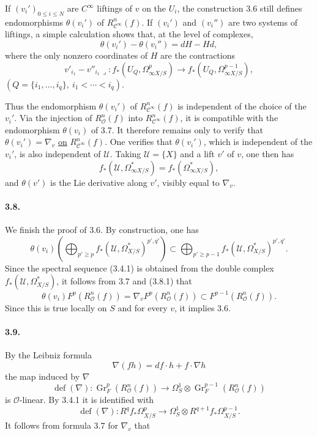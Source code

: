 \documentclass[10pt,leqno]{article}
\newcommand{\cO}{\mathcal O}
\newcommand{\cU}{\mathcal U}
\newcommand{\cC}{\mathcal C}
\newcommand{\Gr}{\operatorname{Gr}}
\theoremstyle{deligne}
\renewcommand{\underline}[1]{\uline{#1}}
\begin{document}
If $(v_i')_{0\le i\le N}$ are $C^\infty$ liftings of $v$ on the $U_i$, the construction 3.6 still defines endomorphisms $\theta(v_i')$ of $R_{\cC^\infty}^n(f)$. If $(v_i')$ and $(v_i'')$ are two systems of liftings, a simple calculation shows that, at the level of complexes,
\begin{equation}
\theta(v_i')-\theta(v_i'')=dH-Hd,
\tag{3.7.1}
\end{equation}
where the only nonzero coordinates of $H$ are the contractions
\[
v'_{i_1}-v''_{i_1}\lrcorner:
 f_*(U_Q,\Omega^p_{\infty X/S})\longrightarrow f_*(U_Q,\Omega^{p-1}_{\infty X/S}),
\]
$(Q=\{i_1,\ldots,i_q\},\ i_1<\cdots<i_q)$.

Thus the endomorphism $\theta(v_i')$ of $R_{\cC^\infty}^n(f)$ is independent of the choice of the $v_i'$. Via the injection of $R_\cO^n(f)$ into $R_{\cC^\infty}^n(f)$, it is compatible with the endomorphism $\theta(v_i)$ of 3.7. It therefore remains only to verify that $\theta(v_i')=\nabla_v$ \underline{on} $R_{\cC^\infty}^n(f)$. One verifies that $\theta(v_i')$, which is independent of the $v_i'$, is also independent of $\cU$. Taking $\cU=\{X\}$ and a lift $v'$ of $v$, one then has
\[
f_*(\cU,\Omega^*_{\infty X/S})=f_*(\Omega^*_{\infty X/S}),
\]
and $\theta(v')$ is the Lie derivative along $v'$, visibly equal to $\nabla_v$.

\paragraph{3.8.}
We finish the proof of 3.6. By construction, one has
\begin{equation}
\theta(v_i)\left(\bigoplus_{p'\ge p} f_*(\cU,\Omega^*_{X/S})^{p',q'}\right)
\subset
\bigoplus_{p'\ge p-1} f_*(\cU,\Omega^*_{X/S})^{p',q'} .
\tag{3.8.1}
\end{equation}
Since the spectral sequence (3.4.1) is obtained from the double complex $f_*(\cU,\Omega^*_{X/S})$, it follows from 3.7 and (3.8.1) that
\begin{equation}
\theta(v_i)F^p(R_\cO^n(f))=\nabla_vF^p(R_\cO^n(f))\subset F^{p-1}(R_\cO^n(f)).
\tag{3.8.2}
\end{equation}
Since this is true locally on $S$ and for every $v$, it implies 3.6.

\paragraph{3.9.}
By the Leibniz formula
\[
\nabla(fh)=df\cdot h+f\cdot \nabla h
\]
the map induced by $\nabla$
\[
\operatorname{def}(\nabla):\Gr_F^p(R_\cO^n(f))\longrightarrow
\Omega_S^1\otimes\Gr_F^{p-1}(R_\cO^n(f))
\]
is $\cO$-linear. By 3.4.1 it is identified with
\begin{equation}
\operatorname{def}(\nabla):R^qf_*\Omega^p_{X/S}\longrightarrow
\Omega_S^1\otimes R^{q+1}f_*\Omega^{p-1}_{X/S}.
\tag{3.9.1}
\end{equation}
It follows from formula 3.7 for $\nabla_v$ that
\end{document}
